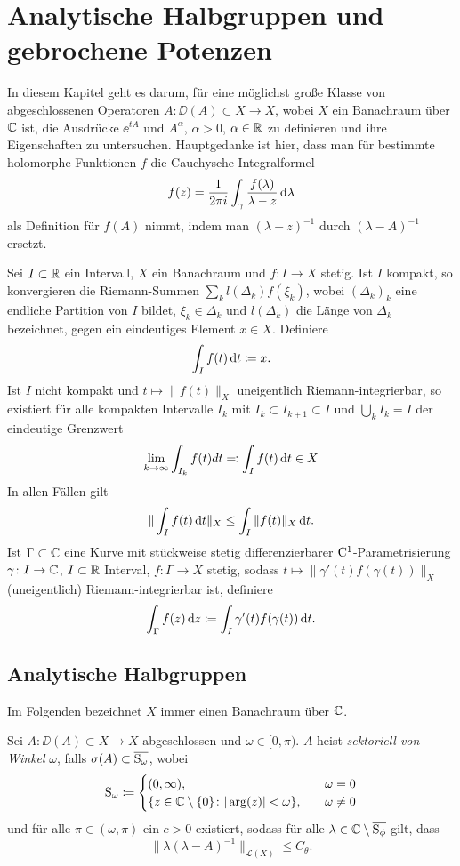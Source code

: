 \chapter{Analytische Halbgruppen und gebrochene Potenzen}

In diesem Kapitel geht es darum, für eine möglichst große Klasse von abgeschlossenen Operatoren $A \colon \DD(A) \subset X \to X$, wobei $X$ ein Banachraum über $\mathbb{C}$ ist, die Ausdrücke $\ee^{tA}$ und $A^\alpha$, $\alpha > 0$, $\alpha \in \mathbb{R}$ zu definieren und ihre Eigenschaften zu untersuchen.
Hauptgedanke ist hier, dass man für bestimmte holomorphe Funktionen $f$ die Cauchysche Integralformel
$$
f(z) = \frac{1}{2\pi i} \int_\gamma \frac{f(\lambda)}{\lambda - z} \, {\operatorname{d}\!{\lambda}}
$$
als Definition für $f(A)$ nimmt, indem man $(\lambda - z)^{-1}$ durch $(\lambda - A)^{-1}$ ersetzt.

Sei $I \subset \mathbb{R}$ ein Intervall, $X$ ein Banachraum und $f \colon I \to X$ stetig.
Ist $I$ kompakt, so konvergieren die Riemann-Summen $\sum_k l(\Delta_k) f(\xi_k)$, wobei $(\Delta_k)_k$ eine endliche Partition von $I$ bildet, $\xi_k \in \Delta_k$ und $l(\Delta_k)$ die Länge von $\Delta_k$ bezeichnet, gegen ein eindeutiges Element $x \in X$.
Definiere
$$
\int_I f(t) \, {\operatorname{d}\!{t}} \coloneqq x.
$$
Ist $I$ nicht kompakt und $t \mapsto \|f(t)\|_X$ uneigentlich Riemann-integrierbar, so existiert für alle kompakten Intervalle $I_k$ mit $I_k \subset I_{k + 1} \subset I$ und $\bigcup_k I_k = I$ der eindeutige Grenzwert
$$
\lim_{k \to \infty} \int_{I_k} f(t) dt \eqqcolon \int_I f(t) \, {\operatorname{d}\!{t}} \in X
$$
In allen Fällen gilt
$$
\| \int_I f(t) \, {\operatorname{d}\!{t}} \|_X \leq \int_I \|f(t) \|_X \, {\operatorname{d}\!{t}}.
$$
Ist $\Gamma \subset \mathbb{C}$ eine Kurve mit stückweise stetig differenzierbarer $\mathrm{C}^1$-Parametrisierung $\gamma \colon I \to \mathbb{C}$, $I \subset \mathbb{R}$ Interval, $f \colon \Gamma \to X$ stetig, sodass $t \mapsto \|\gamma'(t) f(\gamma(t)) \|_X$ (uneigentlich) Riemann-integrierbar ist, definiere
$$
\int_\Gamma f(z) \, {\operatorname{d}\!{z}} \coloneqq \int_I \gamma'(t) f(\gamma(t)) \, {\operatorname{d}\!{t}}.
$$

\section{Analytische Halbgruppen}

Im Folgenden bezeichnet $X$ immer einen Banachraum über $\mathbb{C}$.

\begin{defn}
  Sei $A \colon \DD(A) \subset X \to X$ abgeschlossen und $\omega \in [0,\pi)$.
    $A$ heist \emph{sektoriell von Winkel} $\omega$, falls $\sigma(A) \subset \overline{\mathrm{S}_\omega}$, wobei
    $$
    \mathrm{S}_\omega \coloneqq \begin{cases} (0,\infty), \quad&\omega = 0 \\ \{z \in \mathbb{C} \setminus\{0\} \colon |\arg(z)| < \omega\}, \quad&\omega \neq 0 \end{cases}
    $$
    und für alle $\pi \in (\omega, \pi)$ ein $c > 0$ existiert, sodass für alle $\lambda \in \mathbb{C} \setminus \overline{\mathrm{S}_\phi}$ gilt, dass
    $$
    \|\lambda(\lambda - A)^{-1}\|_{\mathcal{L}(X)} \leq C_\theta.
    $$
\end{defn}

